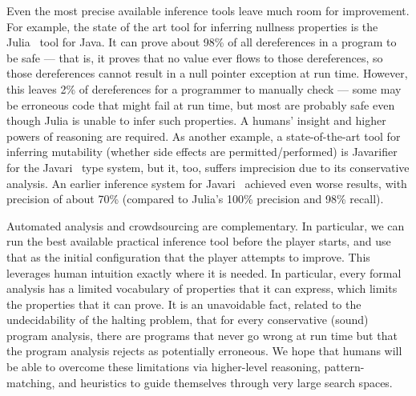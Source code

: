 \documentclass{sig-alternate}
\def\<#1>{\codeid{#1}}
\newcommand{\codeid}[1]{\ifmmode{\mbox{\ttfamily{#1}}}\else{\ttfamily #1}\fi}
\begin{document}
Even the most precise available inference tools leave much room for
improvement.  For example, the state of the art tool for inferring
nullness properties is the
Julia~\cite{julia-web-interface,Spoto2008,Spoto10:LPAR,Spoto10,SpotoE2011}
tool for Java.  It can prove about 98\% of all dereferences in a
program to be safe --- that is, it proves that no \<null> value ever
flows to those dereferences, so those dereferences cannot result in a
null pointer exception at run time.  However, this leaves 2\% of
dereferences for a programmer to manually check --- some may be
erroneous code that might fail at run time, but most are probably safe
even though Julia is unable to infer such properties.  A humans'
insight and higher powers of reasoning are required.  As another
example, a state-of-the-art tool for inferring mutability (whether
side effects are permitted/performed) is
Javarifier~\cite{Quinonez2008,QuinonezTE2008} for the
Javari~\cite{BirkaE2004,TschantzE2005,Tschantz2006} type system, but
it, too, suffers imprecision due to its conservative analysis.  An
earlier inference system for
Javari~\cite{GreenfieldboyceF2005,GreenfieldboyceF2007} achieved even
worse results, with precision of about 70\% (compared to Julia's 100\%
precision and 98\% recall).


Automated analysis and crowdsourcing are complementary.  In
particular, we can run the best available practical inference tool
before the player starts, and use that as the initial configuration
that the player attempts to improve.  This leverages human intuition
exactly where it is needed.  In particular, every formal analysis has
a limited vocabulary of properties that it can express, which limits
the properties that it can prove.  It is an unavoidable fact, related
to the undecidability of the halting problem, that for every
conservative (sound) program analysis, there are programs that never
go wrong at run time but that the program analysis rejects as
potentially erroneous.  We hope that humans will be able to overcome
these limitations via higher-level reasoning, pattern-matching, and
heuristics to guide themselves through very large search spaces.

\end{document}
